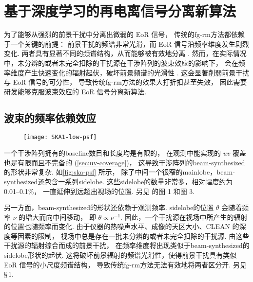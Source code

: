 
\chapter{基于深度学习的再电离信号分离新算法}
\label{chap:cdae}

为了能够从强烈的前景干扰中分离出微弱的 EoR 信号，
传统的\ac{fg-rm}方法都依赖于一个关键的前提：
前景干扰的频谱非常光滑，而 EoR 信号沿频率维度发生剧烈变化.
两者具有显著不同的频谱结构，从而能够被有效地分离 \cite{morales2010,chapman2016}.
然而，在实际情况中，未分辨的或者未完全扣除的干扰源在干涉阵列的波束效应的影响下，
会在频率维度产生快速变化的辐射起伏，破坏前景频谱的光滑性 \cite{liu2009ps}.
这会显著削弱前景干扰与 EoR 信号的可分性，
导致传统\ac{fg-rm}方法的效果大打折扣甚至失效，
因此需要研发能够克服波束效应的 EoR 信号分离新算法.


\section{波束的频率依赖效应}
\label{sec:beam-effect}

\begin{figure}[htp]
  \centering
  \texttt{[image: SKA1-low-psf]}
  \label{fig:ska-psf}
\end{figure}

一个干涉阵列拥有的\ac{baseline}数目和长度均是有限的，
在观测中能实现的 $uv$ 覆盖也是有限而且不完备的 (\autoref{sec:uv-coverage})，
这导致干涉阵列的\ac{beam-synthesized}的形状非常复杂.
如\autoref{fig:ska-psf} 所示，
除了中间一个很窄的\ac{mainlobe}，\ac{beam-synthesized}还包含一系列\ac{sidelobe}.
这些\ac{sidelobe}的数量非常多，相对幅度约为 \numrange{0.01}{0.1}\%，
一直延伸到远超出视场的位置.
另见  的图 1 和图 3.

另一方面，\ac{beam-synthesized}的形状还依赖于观测频率.
\ac{sidelobe}的位置 $\theta$ 会随着频率 $\nu$ 的增大而向中间移动，
即 $\theta \propto \nu^{-1}$.
因此，一个干扰源在视场中所产生的辐射的位置也随频率而变化.
由于仪器的热噪声水平、成像的天区大小、CLEAN 的深度等因素的限制，
视场中总是存在一批未分辨的或者未完全扣除的干扰源.
由这些干扰源的辐射综合而成的前景干扰，
在频率维度将出现类似于\ac{beam-synthesized}的\ac{sidelobe}形状的起伏.
这将破坏前景辐射的频谱光滑性，使得前景干扰具有类似 EoR 信号的小尺度频谱结构，
导致传统\ac{fg-rm}方法无法有效地将两者区分开.
另见  \S\,1.



